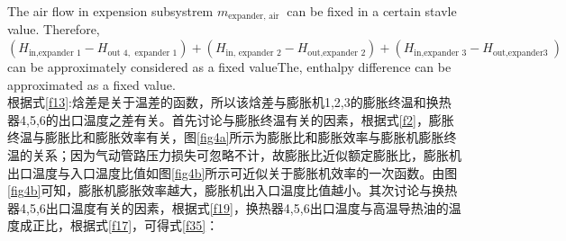 \documentclass[journal,onecolumn]{IEEEtran}
\begin{document}
The air flow in expension subsystrem $ m_{\text {expander, air }} $ can be fixed in a certain stavle value. Therefore, \\
$ \left(H_{\text {in,expander } 1}-H_{\text {out } 4, \text { expander } 1}\right)+\left(H_{\text {in, expander } 2}-H_{\text {out,expander } 2}\right)+\left(H_{\text {in,expander } 3}-H_{\text {out,expander3 }}\right) $ can be approximately considered as a fixed valueThe, enthalpy difference can be approximated as a fixed value.\\

根据式\ref{f13}:焓差是关于温差的函数，所以该焓差与膨胀机1,2,3的膨胀终温和换热器4,5,6的出口温度之差有关。首先讨论与膨胀终温有关的因素，根据式\ref{f2}，膨胀终温与膨胀比和膨胀效率有关，图\ref{fig4a}所示为膨胀比和膨胀效率与膨胀机膨胀终温的关系；因为气动管路压力损失可忽略不计，故膨胀比近似额定膨胀比，膨胀机出口温度与入口温度比值如图\ref{fig4b}所示可近似关于膨胀机效率的一次函数。由图\ref{fig4b}可知，膨胀机膨胀效率越大，膨胀机出入口温度比值越小。其次讨论与换热器4,5,6出口温度有关的因素，根据式\ref{f19}，换热器4,5,6出口温度与高温导热油的温度成正比，根据式\ref{f17}，可得式\ref{f35}：
\end{document}
